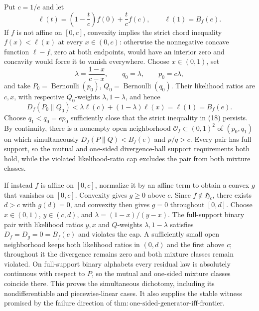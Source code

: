 Put \(c=1/e\) and let
\[
 \ell(t)=\left(1-\frac tc\right)f(0)+\frac tc f(c),
 \qquad \ell(1)=B_f(e).
\]
If \(f\) is not affine on \([0,c]\), convexity implies the strict chord inequality \(f(x)<\ell(x)\) at every \(x\in(0,c)\): otherwise the nonnegative concave function \(\ell-f\), zero at both endpoints, would have an interior zero and concavity would force it to vanish everywhere.  Choose \(x\in(0,1)\), set
\[
 \lambda=\frac{1-x}{c-x},\qquad q_0=\lambda,\qquad p_0=c\lambda,
\]
and take \(P_0=\operatorname{Bernoulli}(p_0)\), \(Q_0=\operatorname{Bernoulli}(q_0)\).  Their likelihood ratios are \(c,x\), with respective \(Q_0\)-weights \(\lambda,1-\lambda\), and hence
\[
 D_f(P_0\|Q_0)<\lambda\ell(c)+(1-\lambda)\ell(x)=\ell(1)=B_f(e). \tag{18}
\]
Choose \(q_1<q_0=ep_0\) sufficiently close that the strict inequality in (18) persists.  By continuity, there is a nonempty open neighborhood \(\mathcal O_f\subset(0,1)^2\) of \((p_0,q_1)\) on which simultaneously \(D_f(P\|Q)<B_f(e)\) and \(p/q>c\).  Every pair has full support, so the mutual and one-sided divergence-ball support requirements both hold, while the violated likelihood-ratio cap excludes the pair from both mixture classes.

If instead \(f\) is affine on \([0,c]\), normalize it by an affine term to obtain a convex \(g\) that vanishes on \([0,c]\).  Convexity gives \(g\ge0\) above \(c\).  Since \(f\notin\mathfrak H_c\), there exists \(d>c\) with \(g(d)=0\), and convexity then gives \(g=0\) throughout \([0,d]\).  Choose \(x\in(0,1)\), \(y\in(c,d)\), and \(\lambda=(1-x)/(y-x)\).  The full-support binary pair with likelihood ratios \(y,x\) and \(Q\)-weights \(\lambda,1-\lambda\) satisfies \(D_f=D_g=0=B_f(e)\) and violates the cap.  A sufficiently small open neighborhood keeps both likelihood ratios in \((0,d)\) and the first above \(c\); throughout it the divergence remains zero and both mixture classes remain violated.  On full-support binary alphabets every residual law is absolutely continuous with respect to \(P\), so the mutual and one-sided mixture classes coincide there.  This proves the simultaneous dichotomy, including its nondifferentiable and piecewise-linear cases.  It also supplies the stable witness promised by the failure direction of \(\mathrm{thm:one\text{-}sided\text{-}generator\text{-}iff\text{-}frontier}\).